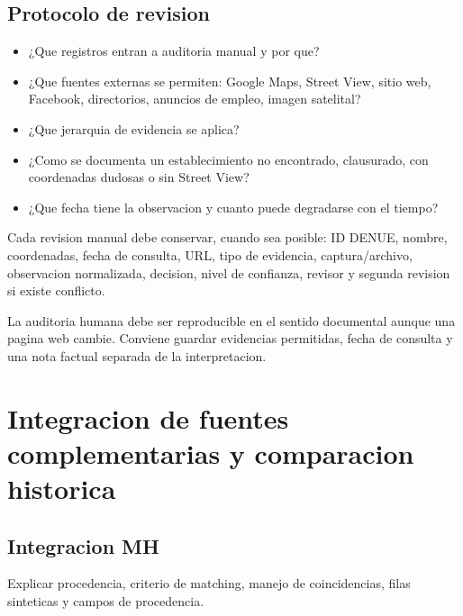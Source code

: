 \documentclass[11pt,letterpaper]{article}
\begin{document}
\subsection{Protocolo de revision}
\begin{preguntas}
\begin{itemize}
    \item ¿Que registros entran a auditoria manual y por que?
    \item ¿Que fuentes externas se permiten: Google Maps, Street View, sitio web, Facebook, directorios, anuncios de empleo, imagen satelital?
    \item ¿Que jerarquia de evidencia se aplica?
    \item ¿Como se documenta un establecimiento no encontrado, clausurado, con coordenadas dudosas o sin Street View?
    \item ¿Que fecha tiene la observacion y cuanto puede degradarse con el tiempo?
\end{itemize}
\end{preguntas}

\begin{evidencia}
Cada revision manual debe conservar, cuando sea posible: ID DENUE, nombre, coordenadas, fecha de consulta, URL, tipo de evidencia, captura/archivo, observacion normalizada, decision, nivel de confianza, revisor y segunda revision si existe conflicto.
\end{evidencia}

\begin{trazabilidad}
La auditoria humana debe ser reproducible en el sentido documental aunque una pagina web cambie. Conviene guardar evidencias permitidas, fecha de consulta y una nota factual separada de la interpretacion.
\end{trazabilidad}

\section{Integracion de fuentes complementarias y comparacion historica}

\subsection{Integracion MH}
Explicar procedencia, criterio de matching, manejo de coincidencias, filas sinteticas y campos de procedencia.
\end{document}
